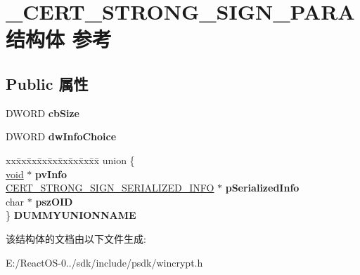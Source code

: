 \hypertarget{struct___c_e_r_t___s_t_r_o_n_g___s_i_g_n___p_a_r_a}{}\section{\+\_\+\+C\+E\+R\+T\+\_\+\+S\+T\+R\+O\+N\+G\+\_\+\+S\+I\+G\+N\+\_\+\+P\+A\+R\+A结构体 参考}
\label{struct___c_e_r_t___s_t_r_o_n_g___s_i_g_n___p_a_r_a}
\subsection*{Public 属性}
\begin{DoxyCompactItemize}
\item 
\mbox{\label{struct___c_e_r_t___s_t_r_o_n_g___s_i_g_n___p_a_r_a_a520d5cafe5b64e533145719d776a9c80}} 
D\+W\+O\+RD {\bfseries cb\+Size}
\item 
\mbox{\label{struct___c_e_r_t___s_t_r_o_n_g___s_i_g_n___p_a_r_a_a8145259f610c8b31fb92fbe6bf229724}} 
D\+W\+O\+RD {\bfseries dw\+Info\+Choice}
\item 
\mbox{\label{struct___c_e_r_t___s_t_r_o_n_g___s_i_g_n___p_a_r_a_a29e2e5c9f8c40dbf3fa62db84ed8e860}} 
\begin{tabbing}
xx\=xx\=xx\=xx\=xx\=xx\=xx\=xx\=xx\=\kill
union \{\\
\>\hyperlink{interfacevoid}{void} $\ast$ {\bfseries pvInfo}\\
\>\hyperlink{struct___c_e_r_t___s_t_r_o_n_g___s_i_g_n___s_e_r_i_a_l_i_z_e_d___i_n_f_o}{CERT\_STRONG\_SIGN\_SERIALIZED\_INFO} $\ast$ {\bfseries pSerializedInfo}\\
\>char $\ast$ {\bfseries pszOID}\\
\} {\bfseries DUMMYUNIONNAME}\\

\end{tabbing}\end{DoxyCompactItemize}


该结构体的文档由以下文件生成\+:\begin{DoxyCompactItemize}
\item 
E\+:/\+React\+O\+S-\/0../sdk/include/psdk/wincrypt.\+h\end{DoxyCompactItemize}
